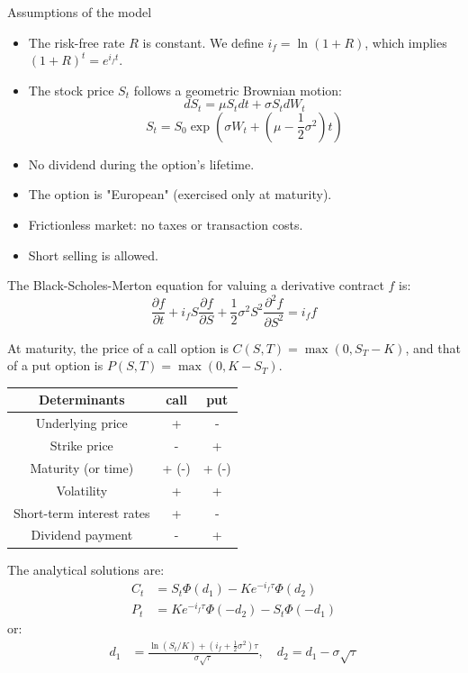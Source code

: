 \begin{f}
Assumptions of the model
\begin{itemize}
	\item The risk-free rate \(R\) is constant. We define \(i_f = \ln(1+R)\), which implies \((1+R)^t = e^{i_f t}\).
	\item The stock price \(S_t\) follows a geometric Brownian motion:
	\[
	dS_t = \mu S_t dt + \sigma S_t dW_t 
	\]
	\[
	 S_t = S_0 \exp\left(\sigma W_t + \left( \mu - \frac{1}{2}\sigma^2 \right)t \right)
	\]
	\item No dividend during the option's lifetime.  
	\item The option is "European" (exercised only at maturity).  
	\item Frictionless market: no taxes or transaction costs.  
	\item Short selling is allowed. 
\end{itemize}

The Black-Scholes-Merton equation for valuing a derivative contract \(f\) is:
\[
\frac{\partial f}{\partial t} + i_f S \frac{\partial f}{\partial S} + \frac{1}{2}\sigma^2 S^2 \frac{\partial^2 f}{\partial S^2} = i_f f
\]

At maturity, the price of a call option is \(C(S,T) = \max(0, S_T - K)\), and that of a put option is \(P(S,T) = \max(0, K - S_T)\).


\begin{center}
	\begin{tabular}{|c|c|c|}
		\hline
		Determinants & \textbf{call}&\textbf{put}\\
		\hline
		Underlying price	      & +&	-\\
		Strike price	              & -&	+\\
		Maturity (or time)    & + (-)&	+ (-)\\
		Volatility	              & +&	+\\
		Short-term interest rates  & +&	-\\
		Dividend payment	      & -&	+\\
		\hline
	\end{tabular}
\end{center}

The analytical solutions are:
\begin{align*}
	C_t &= S_t \Phi(d_1) - Ke^{-i_f \tau} \Phi(d_2) \\
	P_t &= Ke^{-i_f \tau} \Phi(-d_2) - S_t \Phi(-d_1)
\end{align*}
or:
\begin{align*}
	d_1 &= \frac{\ln(S_t/K) + (i_f + \frac{1}{2}\sigma^2)\tau}{\sigma \sqrt{\tau}}, \quad
	d_2 = d_1 - \sigma \sqrt{\tau}
\end{align*}


\end{f}
